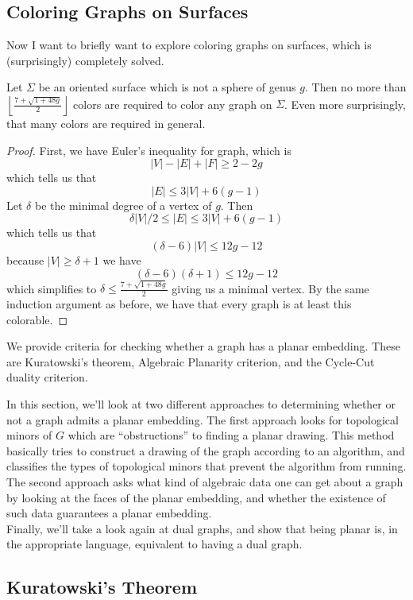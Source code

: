 \subsection{Coloring Graphs on Surfaces}
Now I want to briefly  want to explore coloring graphs on surfaces, which is (surprisingly) completely solved. 
\begin{theorem}
 Let $\Sigma$ be an oriented surface which is not a sphere of genus $g$. Then no more than $\left \lfloor \frac{7+\sqrt{1+48g}}{2}\right \rfloor$ colors are required to color any graph on $\Sigma$. Even more surprisingly, that many colors are required in general. 
\end{theorem}
\begin{proof}
 First, we have Euler's inequality for graph, which is 
 \[|V|-|E|+|F|\geq 2-2g\]
 which tells us that 
 \[|E|\leq 3|V|+6(g-1)\]
 Let $\delta$ be the minimal degree of a vertex of $g$. Then 
 \[\delta |V|/2\leq |E|\leq 3|V|+6(g-1)\]
 which tells us that 
 \[(\delta-6)|V|\leq 12g-12\]
 because $|V|\geq \delta+1$ we have 
 \[(\delta-6)(\delta+1)\leq 12g-12\]
 which simplifies to $\delta\leq \frac{7+\sqrt{1+48g}}{2}$ giving us a minimal vertex. By the same induction argument as before, we have that every graph is at least this colorable. 
\end{proof}
\begin{elevator}
We provide criteria for checking whether a graph has a planar embedding. These are Kuratowski's theorem, Algebraic Planarity criterion, and the Cycle-Cut duality criterion. 
\end{elevator}
\label{sec:planar:criterion}
In this section, we'll look at two different approaches to determining whether or not a graph admits a planar embedding. The first approach looks for topological minors of $G$ which are ``obstructions'' to finding a planar drawing. This method basically tries to construct a drawing of the graph according to an algorithm, and classifies the types of topological minors that prevent the algorithm from running.\\
The second approach asks what kind of algebraic data one can get about a graph by looking at the faces of the planar embedding, and whether the existence of such data guarantees a planar embedding. \\
Finally, we'll take a look again at dual graphs, and show that being planar is, in the appropriate language, equivalent to having a dual graph. 
\subsection{Kuratowski's Theorem}

